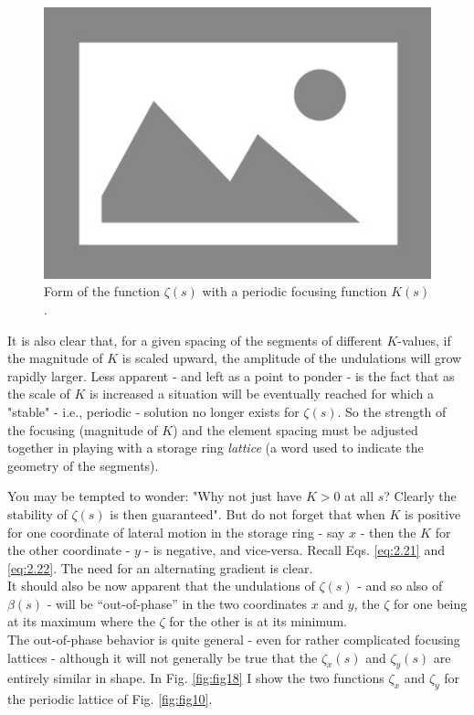 \begin{figure}[!htb]
	\centering
	\includegraphics[width=0.8\linewidth]{./Figuras/placeholder.png}
	\caption{Form of the function $\zeta(s)$ with a periodic focusing function $K(s)$.}
	\label{fig:fig17}
\end{figure}

It is also clear that, for a given spacing of the segments of different $K$-values, if the magnitude of $K$ is scaled upward, the amplitude of the undulations will grow rapidly larger. Less apparent - and left as a point to ponder - is the fact that as the scale of $K$ is increased a situation will be eventually reached for which a "stable" - i.e., periodic - solution no longer exists for $\zeta(s)$. So the strength of the focusing (magnitude of $K$) and the element spacing must be adjusted together in playing with a storage ring \emph{lattice} (a word used to indicate the geometry of the segments).

You may be tempted to wonder: "Why not just have $K > 0$ at all $s$? Clearly the stability of $\zeta(s)$ is then guaranteed". But do not forget that when $K$ is positive for one coordinate
 of lateral motion in the storage ring - say $x$ - then the $K$ for the other coordinate - $y$ - is negative, and vice-versa. Recall Eqs. \eqref{eq:2.21} and \eqref{eq:2.22}. The need for an alternating gradient is clear.\\
It should also be now apparent that the undulations of $\zeta(s)$ - and so also of $\beta(s)$ - will be “out-of-phase” in the two coordinates $x$ and $y$, the $\zeta$ for one being at
its maximum where the $\zeta$ for the other is at its minimum.\\
The out-of-phase behavior is quite general - even for rather complicated focusing lattices - although it will not generally be true that the $\zeta_x(s)$ and $\zeta_y(s)$ are entirely
 similar in shape. In Fig. \ref{fig:fig18} I show the two functions $\zeta_x$ and $\zeta_y$ for the periodic lattice of Fig. \ref{fig:fig10}.

